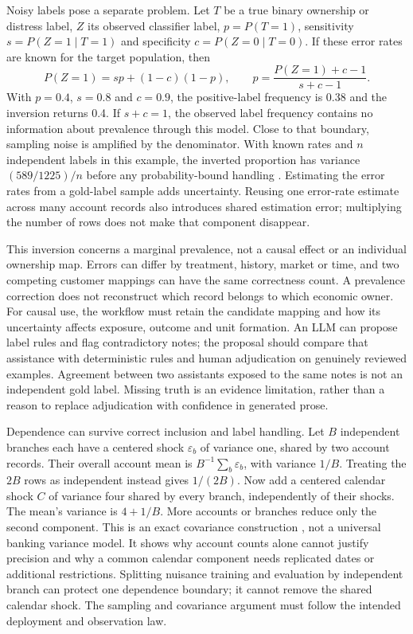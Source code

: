 Noisy labels pose a separate problem. Let $T$ be a true binary ownership or
distress label, $Z$ its observed classifier label, $p=P(T=1)$, sensitivity
$s=P(Z=1\mid T=1)$ and specificity $c=P(Z=0\mid T=0)$. If these error rates are
known for the target population, then
\[
 P(Z=1)=sp+(1-c)(1-p),\qquad
 p=\frac{P(Z=1)+c-1}{s+c-1}.
\]
With $p=0.4$, $s=0.8$ and $c=0.9$, the positive-label frequency is 0.38 and
the inversion returns 0.4. If $s+c=1$, the observed label frequency contains
no information about prevalence through this model. Close to that boundary,
sampling noise is amplified by the denominator. With known rates and $n$
independent labels in this example, the inverted proportion has variance
$(589/1225)/n$ before any probability-bound handling
\citep{exec14_workflow_oracle}. Estimating the error rates from a gold-label
sample adds uncertainty. Reusing one error-rate estimate across many account
records also introduces shared estimation error; multiplying the number of
rows does not make that component disappear.

This inversion concerns a marginal prevalence, not a causal effect or an
individual ownership map. Errors can differ by treatment, history, market or
time, and two competing customer mappings can have the same correctness
count. A prevalence correction does not reconstruct which record belongs to
which economic owner. For causal use, the workflow must retain the candidate
mapping and how its uncertainty affects exposure, outcome and unit formation.
An LLM can propose label rules and flag contradictory notes; the proposal
should compare that assistance with deterministic rules and human adjudication
on genuinely reviewed examples. Agreement between two assistants exposed to
the same notes is not an independent gold label. Missing truth is an evidence
limitation, rather than a reason to replace adjudication with confidence in
generated prose.

Dependence can survive correct inclusion and label handling. Let $B$ independent
branches each have a centered shock $\varepsilon_b$ of variance one, shared
by two account records. Their overall account mean is
$B^{-1}\sum_b\varepsilon_b$, with variance $1/B$. Treating the $2B$ rows as
independent instead gives $1/(2B)$. Now add a centered calendar shock $C$ of
variance four shared by every branch, independently of their shocks. The
mean's variance is $4+1/B$. More accounts or branches reduce only the second
component. This is an exact covariance construction
\citep{exec14_workflow_oracle}, not a universal banking variance model. It
shows why account counts alone cannot justify precision and why a common
calendar component needs replicated dates or additional restrictions.
Splitting nuisance training and evaluation by independent branch can protect
one dependence boundary; it cannot remove the shared calendar shock. The
sampling and covariance argument must follow the intended deployment and
observation law.

